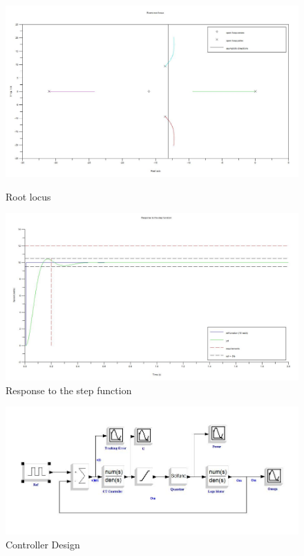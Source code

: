 \documentclass[a4paper,12pt,oneside]{article}
\begin{document}
\begin{enumerate}
\begin{figure}
	\centering
	\includegraphics[width=\columnwidth]{D22.jpg}
	\caption{Root locus}
	\label{fig:D22}
	\centering
	\includegraphics[width=\columnwidth]{D21.jpg}
	\caption{Response to the step function}
	\label{fig:D21}
\end{figure}

\begin{figure}
	\centering
	\includegraphics[width=\columnwidth]{D23.jpg}
	\caption{Controller Design}
	\label{fig:D23}
\end{figure}


\end{enumerate}
\end{document}
